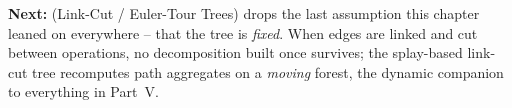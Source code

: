\begin{lastword}
\medskip
\textbf{Next:}  (Link-Cut / Euler-Tour Trees) drops the last assumption this chapter leaned
on everywhere -- that the tree is \emph{fixed}. When edges are linked and cut between operations, no
decomposition built once survives; the splay-based link-cut tree recomputes path aggregates on a
\emph{moving} forest, the dynamic companion to everything in Part~V.
\end{lastword}
